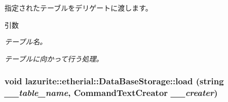 \label{classlazurite_1_1etherial_1_1_data_base_storage_a4799451dac40d2f2939709bb84cb6212}
指定されたテーブルをデリゲートに渡します。 
\begin{DoxyParams}{引数}
\item[{\em テーブル名。}]\item[{\em テーブルに向かって行う処理。}]\end{DoxyParams}
\hypertarget{classlazurite_1_1etherial_1_1_data_base_storage_af54444ae47537e9d80854457a43b0574}{
\subsubsection[{load}]{\setlength{\rightskip}{0pt plus 5cm}void lazurite::etherial::DataBaseStorage::load (string {\em \_\-\_\-table\_\-name}, \/  CommandTextCreator {\em \_\-\_\-creater})}}
\label{classlazurite_1_1etherial_1_1_data_base_storage_af54444ae47537e9d80854457a43b0574}

